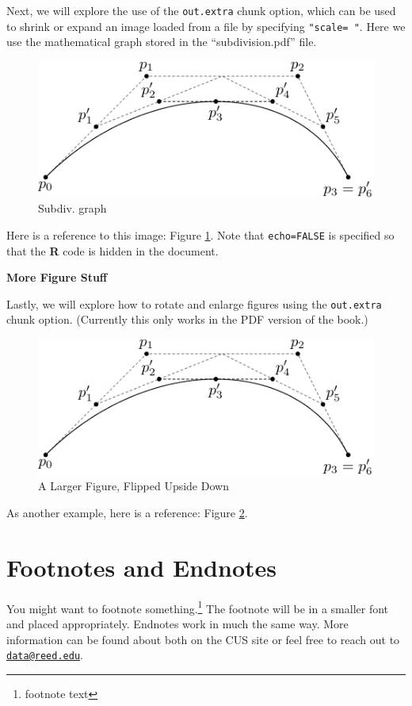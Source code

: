 \documentclass[12pt,twoside]{reedthesis}
\theoremstyle{definition}
\theoremstyle{definition}
\theoremstyle{definition}
\theoremstyle{remark}
\begin{document}
\clearpage

Next, we will explore the use of the \texttt{out.extra} chunk option,
which can be used to shrink or expand an image loaded from a file by
specifying \texttt{"scale=\ "}. Here we use the mathematical graph
stored in the ``subdivision.pdf'' file.
\begin{figure}
\includegraphics[scale=0.75]{figure/subdivision} \caption{Subdiv. graph}\label{fig:subd}
\end{figure}
Here is a reference to this image: Figure \ref{fig:subd}. Note that
\texttt{echo=FALSE} is specified so that the \textbf{R} code is hidden
in the document.

\textbf{More Figure Stuff}

Lastly, we will explore how to rotate and enlarge figures using the
\texttt{out.extra} chunk option. (Currently this only works in the PDF
version of the book.)
\begin{figure}
\includegraphics[angle=180, scale=1.1]{figure/subdivision} \caption{A Larger Figure, Flipped Upside Down}\label{fig:subd2}
\end{figure}
As another example, here is a reference: Figure \ref{fig:subd2}.

\hypertarget{footnotes-and-endnotes}{%
\section{Footnotes and Endnotes}\label{footnotes-and-endnotes}}

You might want to footnote something.\footnote{footnote text} The
footnote will be in a smaller font and placed appropriately. Endnotes
work in much the same way. More information can be found about both on
the CUS site or feel free to reach out to
\href{mailto:data@reed.edu}{\nolinkurl{data@reed.edu}}.
\end{document}
